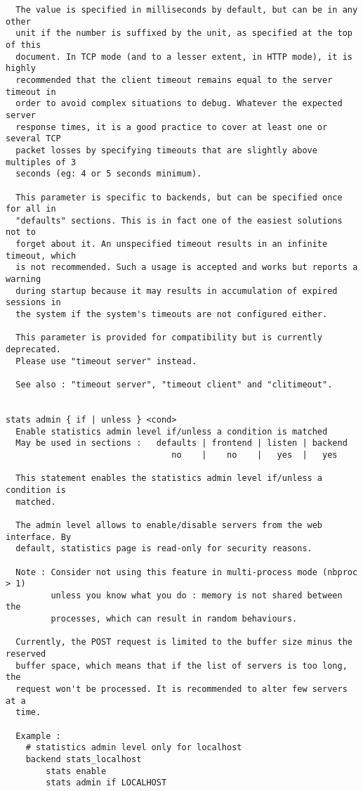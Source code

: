 \begin{verbatim}
  The value is specified in milliseconds by default, but can be in any other
  unit if the number is suffixed by the unit, as specified at the top of this
  document. In TCP mode (and to a lesser extent, in HTTP mode), it is highly
  recommended that the client timeout remains equal to the server timeout in
  order to avoid complex situations to debug. Whatever the expected server
  response times, it is a good practice to cover at least one or several TCP
  packet losses by specifying timeouts that are slightly above multiples of 3
  seconds (eg: 4 or 5 seconds minimum).

  This parameter is specific to backends, but can be specified once for all in
  "defaults" sections. This is in fact one of the easiest solutions not to
  forget about it. An unspecified timeout results in an infinite timeout, which
  is not recommended. Such a usage is accepted and works but reports a warning
  during startup because it may results in accumulation of expired sessions in
  the system if the system's timeouts are not configured either.

  This parameter is provided for compatibility but is currently deprecated.
  Please use "timeout server" instead.

  See also : "timeout server", "timeout client" and "clitimeout".


stats admin { if | unless } <cond>
  Enable statistics admin level if/unless a condition is matched
  May be used in sections :   defaults | frontend | listen | backend
                                 no    |    no    |   yes  |   yes

  This statement enables the statistics admin level if/unless a condition is
  matched.

  The admin level allows to enable/disable servers from the web interface. By
  default, statistics page is read-only for security reasons.

  Note : Consider not using this feature in multi-process mode (nbproc > 1)
         unless you know what you do : memory is not shared between the
         processes, which can result in random behaviours.

  Currently, the POST request is limited to the buffer size minus the reserved
  buffer space, which means that if the list of servers is too long, the
  request won't be processed. It is recommended to alter few servers at a
  time.

  Example :
    # statistics admin level only for localhost
    backend stats_localhost
        stats enable
        stats admin if LOCALHOST


\end{verbatim}
